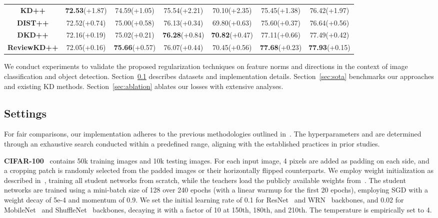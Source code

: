 \documentclass{article}
\begin{document}
\begin{table}
{\begin{tabular}{c|ccc|ccc}
        \hline
        \textbf{KD++} & \textbf{72.53}(+1.87) & 74.59(+1.05) & 75.54(+2.21) & 70.10(+2.35) & 75.45(+1.38) & 76.42(+1.97)\\
        \textbf{DIST++} & 72.52(+0.74) & 75.00(+0.58) & 76.13(+0.34) & 69.80(+0.63) & 75.60(+0.37) & 76.64(+0.56)\\
        \textbf{DKD++} & 72.16(+0.19) & 75.02(+0.21) & \textbf{76.28}(+0.84) & \textbf{70.82}(+0.47) & 77.11(+0.66) & 77.49(+0.42)\\
        \textbf{ReviewKD++} & 72.05(+0.16) & \textbf{75.66}(+0.57) & 76.07(+0.44) & 70.45(+0.56) & \textbf{77.68}(+0.23) & \textbf{77.93}(+0.15)\\
        \hline
        \end{tabular}
    }
        \vspace{-1mm}
        \label{tab:cifar100-sota}
\end{table} 
We conduct experiments to validate the proposed regularization techniques on feature norms and directions in the context of image classification and object detection.
Section~\ref{sec:setup} describes datasets and implementation details.
Section~\ref{sec:sota} benchmarks our approaches and existing KD methods.
Section~\ref{sec:ablation} ablates our losses with extensive analyses.

\subsection{Settings}\label{sec:setup}


For fair comparisons, our implementation adheres to the previous methodologies outlined in~\cite{tian2019contrastive, chen2021distilling, zhao2022decoupled, huang2022knowledge}. The hyperparameters  and  are determined through an exhaustive search conducted within a predefined range, aligning with the established practices in prior studies.

\textbf{CIFAR-100}~\cite{krizhevsky2009learning} contains 50k training images and 10k testing images. For each input image, 4 pixels are added as padding on each side, and a  cropping patch is randomly selected from the padded images or their horizontally flipped counterparts. We employ weight initialization as described in~\cite{he2015delving}, training all student networks from scratch, while the teachers load the publicly available weights from~\cite{tian2019contrastive}. The student networks are trained using a mini-batch size of 128 over 240 epochs (with a linear warmup for the first 20 epochs), employing SGD with a weight decay of 5e-4 and momentum of 0.9. We set the initial learning rate of 0.1 for ResNet~\cite{he2016deep} and WRN~\cite{zagoruyko2016wide} backbones, and 0.02 for MobileNet~\cite{sandler2018mobilenetv2} and ShuffleNet~\cite{ma2018shufflenet} backbones, decaying it with a factor of 10 at 150th, 180th, and 210th. The temperature is empirically set to 4. 
\end{document}
